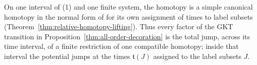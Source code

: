 On one interval of (1) and one finite system, the homotopy is a simple
canonical homotopy in the normal form of \cite[Lem.~3.40]{grossetal2022open}
for its own assignment of times to label subsets
(Theorem~\ref{thm:relative-homotopy-lifting}).  Thus every factor of the
GKT transition in Proposition~\ref{thm:all-order-decoration} is the total
jump, across its time interval, of a finite restriction of one compatible
homotopy; inside that interval the potential jumps at the times
$\mathfrak t(J)$ assigned to
the label subsets $J$.

